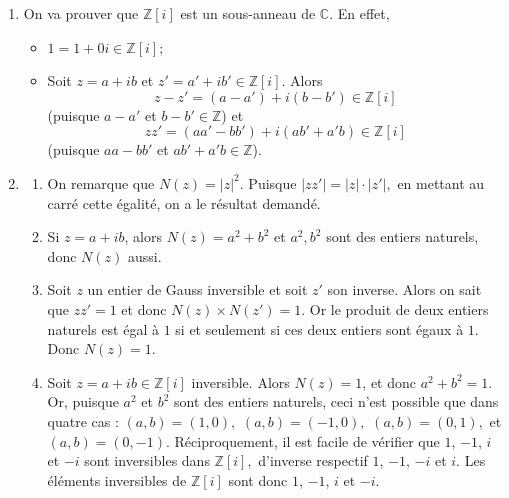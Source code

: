 \documentclass[11pt,a4paper]{article}
\begin{document}
	\begin{corrige}
		\begin{enumerate}
			
			\item  On va prouver que $\mathbb Z[i]$ est un sous-anneau de $\mathbb C.$
			En effet,
			
			\begin{itemize}
				
				\item  $1=1+0i\in\mathbb Z[i];$
				
				\item  Soit $z=a+ib$ et $z'=a'+ib'\in\mathbb Z[i].$ Alors 
				$$z-z'=(a-a')+i(b-b')\in\mathbb Z[i]$$
				(puisque $a-a'$ et $b-b'\in\mathbb Z$) et 
				$$zz'=(aa'-bb')+i(ab'+a'b)\in\mathbb Z[i]$$
				(puisque $aa-bb'$ et $ab'+a'b\in\mathbb Z$).
				
			\end{itemize}
			
			
			\item  
			\begin{enumerate}
				
				\item  On remarque que $N(z)=|z|^2.$ Puisque $|zz'|=|z|\cdot |z'|,$ en mettant au carré cette égalité, on a le résultat demandé.
				
				\item  Si $z=a+ib$, alors $N(z)=a^2+b^2$ et $a^2,b^2$ sont des entiers naturels, donc $N(z)$ aussi.
				
				\item  Soit $z$ un entier de Gauss inversible et soit $z'$ son inverse. Alors on sait que $zz'=1$ et donc $N(z)\times N(z')=1$. Or le produit de deux entiers naturels est égal à $1$ si et seulement si ces deux entiers sont égaux à $1$. Donc $N(z)=1.$
				
				\item  Soit $z=a+ib\in\mathbb Z[i]$ inversible. Alors $N(z)=1$, et donc $a^2+b^2=1.$ Or, puisque $a^2$ et $b^2$ sont des entiers naturels, ceci n'est possible que dans quatre cas : $(a,b)=(1,0),$ $(a,b)=(-1,0),$ $(a,b)=(0,1),$
				et $(a,b)=(0,-1).$ Réciproquement, il est facile de vérifier que $1$, $-1$, $i$ et $-i$ sont inversibles dans $\mathbb Z[i],$ d'inverse respectif $1$, $-1$, $-i$ et $i$. Les éléments inversibles de $\mathbb Z[i]$ sont donc $1$, $-1$, $i$ et $-i.$
				
			\end{enumerate}
			
			
		\end{enumerate}
	\end{corrige}
	
\end{document}
